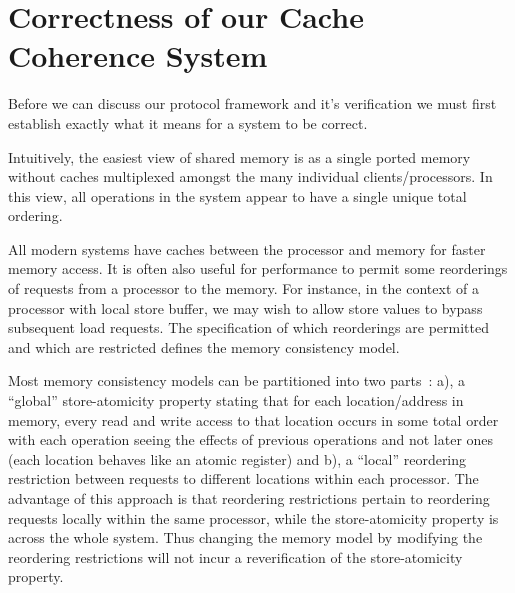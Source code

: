 \section{Correctness of our Cache Coherence System}
\label{Background}

Before we can discuss our protocol framework and it's verification we
must first establish exactly what it means for a system to be
correct. 

Intuitively, the easiest view of shared memory is as a single ported
memory without caches multiplexed amongst the many individual clients/processors. In
this view, all operations in the system appear to have a single unique
total ordering.

All modern systems have caches between the processor and memory for faster memory access.
It is often also useful for performance to permit some reorderings of requests from a processor to the memory.
For instance, in the context of a processor with local store buffer, we may
wish to allow store values to bypass subsequent load requests. The specification of
 which reorderings are permitted and which are restricted defines the memory consistency
model.


Most memory consistency models can be partitioned into two
parts~\cite{Arvind-memory-model}: a), a ``global'' store-atomicity
property stating that for each location/address in memory, every read and write access to that 
location occurs in some total order with each operation
seeing the effects of previous operations and not later ones (each location behaves like an atomic register) and b),
a ``local'' reordering restriction between requests to different
locations within each processor. The advantage of this approach is
that reordering restrictions pertain to reordering requests locally within
the same processor, while the store-atomicity property is across the whole
system. Thus changing the memory model
by modifying the reordering restrictions will not incur a reverification of
the store-atomicity property.


